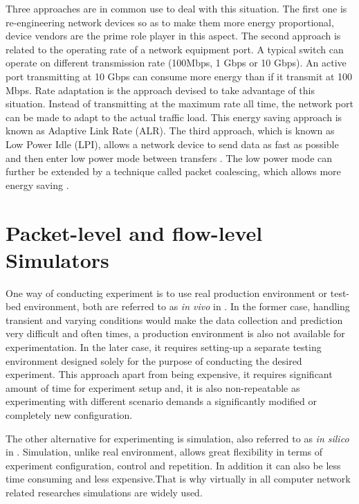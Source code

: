 Three approaches are in common use to deal with this situation. The first one is re-engineering network devices so as to make them more energy proportional, device vendors are the prime role player in this aspect. The second approach is related to the operating rate of a network equipment port. A typical switch can operate on different transmission rate (100Mbps, 1 Gbps or 10 Gbps). An active port transmitting at 10 Gbps can consume more energy than if it transmit at 100 Mbps. Rate adaptation is the approach devised to take advantage of this situation. Instead of transmitting at the maximum rate all time,  the network port can be made to adapt to the actual traffic load. This energy saving approach is known as Adaptive Link Rate (ALR)\cite{DBLP:conf/nsdi/NedevschiPIRW08}. The third approach, which is known as Low Power Idle (LPI), allows a network device to send data as fast as possible and then enter low power mode between transfers \cite{DBLP:journals/computer/BarrosoH07}. The low power mode can further be extended by a technique called packet coalescing, which allows more energy saving \cite{DBLP:journals/comsur/BollaBDC11}. 
\section{Packet-level and flow-level Simulators}
\label{section:packetflow} 
One way of conducting experiment is to use real production environment or test-bed environment, both are referred to as \emph{in vivo} in \cite{DBLP:journals/jpdc/CasanovaGLQS14}. In the former case, handling transient and varying conditions would make the data collection and prediction very difficult and often times, a production environment is also not available for experimentation. In the later case, it requires setting-up a separate testing environment designed solely for the purpose of conducting the desired experiment. This approach apart from being expensive, it requires significant amount of time for experiment setup and, it is also non-repeatable as experimenting with different scenario demands a significantly modified or completely new configuration.

The other alternative for experimenting is simulation, also referred to as \emph{in silico} in \cite{DBLP:journals/jpdc/CasanovaGLQS14}. Simulation, unlike real environment, allows great flexibility in terms of experiment configuration, control and repetition. In addition it can also be less time consuming and less expensive.That is why virtually in all computer network related researches simulations are widely used. 

